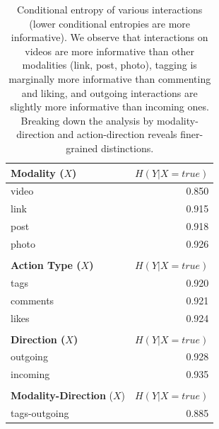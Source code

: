 
\begin{table}
\caption{Conditional entropy of various interactions (lower
  conditional entropies are more informative).  We observe that
  interactions on videos are more informative than other modalities
  (link, post, photo), tagging is marginally more informative than
  commenting and liking, and outgoing interactions are slightly more
  informative than incoming ones.  Breaking down the analysis by
  modality-direction and action-direction reveals finer-grained
  distinctions.}
\label{table:ce_interaction}
\centering
{
	\begin{tabular}{| >{\small}l | >{\small}r | }
		\hline
		\textbf{ Modality ($X$)} & $H(Y|X=true)$ \\
		\hline
		{ video } & 0.850 \\
		\hline
		{ link } & 0.915 \\
		\hline
		{ post } & 0.918 \\
		\hline
		{ photo } & 0.926 \\
		\hline
\multicolumn{2}{c}{}\\
		\hline
		\textbf{Action Type ($X$)}  & $H(Y|X=true)$ \\
		\hline
		{ tags }  &  0.920 \\
		\hline
		{ comments }  &  0.921 \\
		\hline
		{ likes }  &  0.924 \\
		\hline
\multicolumn{2}{c}{}\\
		\hline
		\textbf{ Direction ($X$) } & $H(Y|X=true)$ \\
		\hline
		{ outgoing }  &  0.928 \\
		\hline
		{ incoming }  &  0.935 \\
		\hline
\multicolumn{2}{c}{}\\
%	
		\hline
		\textbf{Modality-Direction} ($X$) & $H(Y|X=true)$ \\
		\hline
		tags-outgoing & 0.885 \\

\end{tabular}}
\end{table}
